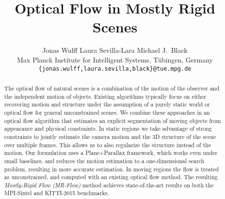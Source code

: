 \documentclass[10pt,twocolumn,letterpaper]{article}
\begin{document}
\title{Optical Flow in Mostly Rigid Scenes}


\author{Jonas Wulff \quad \quad Laura Sevilla-Lara \quad \quad Michael J.~Black\hspace{0.1in}\\ 
    Max Planck Institute for Intelligent Systems, T\"{u}bingen, Germany\\
    {\tt\small  \{jonas.wulff,laura.sevilla,black\}@tue.mpg.de}
       }


\maketitle
\thispagestyle{empty}






\begin{abstract}
The optical flow of natural scenes is a combination of the motion of the observer and the independent motion of objects.
Existing algorithms typically focus on either recovering motion and structure under the assumption of a purely static world or optical flow for general unconstrained scenes.
We combine these approaches in an optical flow algorithm that estimates an explicit segmentation of moving objects from appearance and physical constraints.
In static regions we take advantage of
strong constraints to jointly estimate the camera motion and the 3D structure of the scene over multiple frames. This allows us to also regularize the structure instead of the motion. Our formulation uses a Plane+Parallax framework, which works even under small baselines, and reduces the motion estimation to a one-dimensional search problem, resulting in more accurate estimation. 
In moving regions the flow is treated as unconstrained, and computed with an existing optical flow method. The resulting {\em Mostly-Rigid Flow (MR-Flow)} method achieves state-of-the-art results on both the MPI-Sintel and KITTI-2015 benchmarks.
\end{abstract}
 
\end{document}
